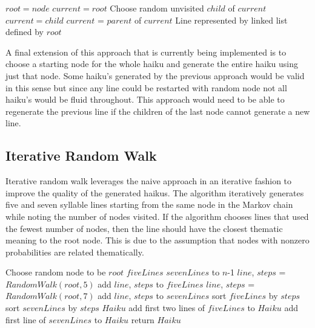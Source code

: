 \documentclass[]{article}
\begin{document}
\begin{algorithm}[H]
	\caption{$Depth\_First\_Search(node, n)$} \label{DFSB_WithStart}
	\begin{algorithmic}[1]
		\State $root = node$
		\State $current = root$
		\State Choose random unvisited $child$ of $current$
		\State $current = child$
		\EndIf
		\Else
		\Else
		\State $current$ = $parent$ of $current$
		\EndIf
		\EndIf
		\EndWhile
		\Return Line represented by linked list defined by $root$
	\end{algorithmic}
\end{algorithm}

A final extension of this approach that is currently being implemented is to choose a starting node for the whole haiku and generate the entire haiku using just that node. Some haiku's generated by the previous approach would be valid in this sense but since any line could be restarted with random node not all haiku's would be fluid throughout. This approach would need to be able to regenerate the previous line if the children of the last node cannot generate a new line.


\subsection{Iterative Random Walk}

Iterative random walk leverages the naive approach in an iterative fashion to improve the quality of the generated haikus. The algorithm iteratively generates five and seven syllable lines starting from the same node in the Markov chain while noting the number of nodes visited. If the algorithm chooses lines that used the fewest number of nodes, then the line should have the closest thematic meaning to the root node. This is due to the assumption that nodes with nonzero probabilities are related thematically.

\begin{algorithm}[H]
	\caption{$IterativeRandomWalk(n)$} \label{IterativeRandomWalk}
	\begin{algorithmic}[1]
		\State Choose random node to be $root$
		\State $fiveLines$
		\State $sevenLines$
		 to $n$-1
			\State $line$, $steps$ = $RandomWalk(root, 5)$
			\State add $line$, $steps$ to $fiveLines$
			\State $line$, $steps$ = $RandomWalk(root, 7)$
			\State add $line$, $steps$ to $sevenLines$ 
		\EndFor
		\State sort $fiveLines$ by $steps$
		\State sort $sevenLines$ by $steps$
		\State $Haiku$
		\State add first two lines of $fiveLines$ to $Haiku$
		\State add first line of $sevenLines$ to $Haiku$
		\State return $Haiku$
	\end{algorithmic}
\end{algorithm}
\end{document}
